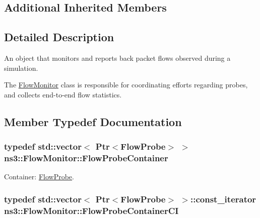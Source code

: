 \subsection*{Additional Inherited Members}


\subsection{Detailed Description}
An object that monitors and reports back packet flows observed during a simulation. 

The \hyperlink{classns3_1_1FlowMonitor}{Flow\+Monitor} class is responsible for coordinating efforts regarding probes, and collects end-\/to-\/end flow statistics. 

\subsection{Member Typedef Documentation}
\subsubsection[{\texorpdfstring{Flow\+Probe\+Container}{FlowProbeContainer}}]{\setlength{\rightskip}{0pt plus 5cm}typedef std\+::vector$<$ {\bf Ptr}$<${\bf Flow\+Probe}$>$ $>$ {\bf ns3\+::\+Flow\+Monitor\+::\+Flow\+Probe\+Container}}\hypertarget{classns3_1_1FlowMonitor_a35214d6743fdb20acd43eff946b2050d}{}\label{classns3_1_1FlowMonitor_a35214d6743fdb20acd43eff946b2050d}


Container\+: \hyperlink{classns3_1_1FlowProbe}{Flow\+Probe}. 

\subsubsection[{\texorpdfstring{Flow\+Probe\+Container\+CI}{FlowProbeContainerCI}}]{\setlength{\rightskip}{0pt plus 5cm}typedef std\+::vector$<$ {\bf Ptr}$<${\bf Flow\+Probe}$>$ $>$\+::const\+\_\+iterator {\bf ns3\+::\+Flow\+Monitor\+::\+Flow\+Probe\+Container\+CI}}\hypertarget{classns3_1_1FlowMonitor_aa035a998de5554f6925692bc9588690f}{}\label{classns3_1_1FlowMonitor_aa035a998de5554f6925692bc9588690f}


